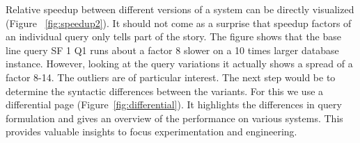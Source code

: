 \documentclass{cidr-2019}
\begin{document}
Relative speedup between different versions of a system can be
directly visualized (Figure ~\ref{fig:speedup2}). It should not come
as a surprise that speedup factors of an individual query only tells
part of the story. The figure shows that the base line query SF 1
Q1
runs about a factor 8
slower on a 10 times larger database instance.  However, looking at
the query variations it actually shows a spread of a factor 8-14. The
outliers are of particular interest. The next step would be to
determine the syntactic differences between the variants. For this we
use a differential page (Figure~\ref{fig:differential}). It highlights
the differences in query formulation and gives an overview of the
performance on various systems. This provides valuable insights to
focus experimentation and engineering.




\end{document}
